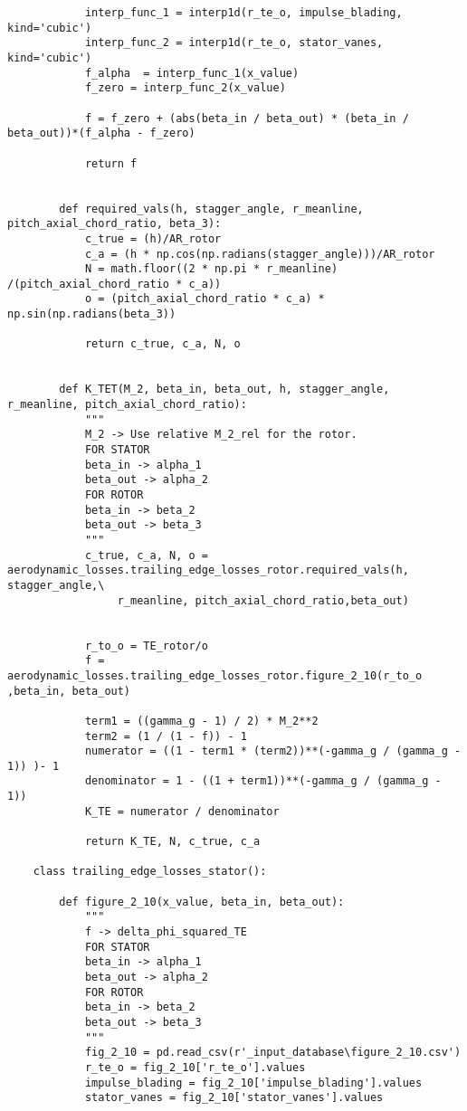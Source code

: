 \begin{verbatim}
            interp_func_1 = interp1d(r_te_o, impulse_blading, kind='cubic')
            interp_func_2 = interp1d(r_te_o, stator_vanes, kind='cubic')
            f_alpha  = interp_func_1(x_value)
            f_zero = interp_func_2(x_value)

            f = f_zero + (abs(beta_in / beta_out) * (beta_in / beta_out))*(f_alpha - f_zero)

            return f
        

        def required_vals(h, stagger_angle, r_meanline, pitch_axial_chord_ratio, beta_3):
            c_true = (h)/AR_rotor
            c_a = (h * np.cos(np.radians(stagger_angle)))/AR_rotor
            N = math.floor((2 * np.pi * r_meanline) /(pitch_axial_chord_ratio * c_a))
            o = (pitch_axial_chord_ratio * c_a) * np.sin(np.radians(beta_3))

            return c_true, c_a, N, o
            

        def K_TET(M_2, beta_in, beta_out, h, stagger_angle, r_meanline, pitch_axial_chord_ratio):
            """
            M_2 -> Use relative M_2_rel for the rotor.
            FOR STATOR
            beta_in -> alpha_1
            beta_out -> alpha_2
            FOR ROTOR
            beta_in -> beta_2
            beta_out -> beta_3
            """
            c_true, c_a, N, o = aerodynamic_losses.trailing_edge_losses_rotor.required_vals(h, stagger_angle,\
                 r_meanline, pitch_axial_chord_ratio,beta_out)


            r_to_o = TE_rotor/o
            f = aerodynamic_losses.trailing_edge_losses_rotor.figure_2_10(r_to_o ,beta_in, beta_out)
            
            term1 = ((gamma_g - 1) / 2) * M_2**2
            term2 = (1 / (1 - f)) - 1
            numerator = ((1 - term1 * (term2))**(-gamma_g / (gamma_g - 1)) )- 1
            denominator = 1 - ((1 + term1))**(-gamma_g / (gamma_g - 1))
            K_TE = numerator / denominator
            
            return K_TE, N, c_true, c_a
        
    class trailing_edge_losses_stator():

        def figure_2_10(x_value, beta_in, beta_out):
            """
            f -> delta_phi_squared_TE
            FOR STATOR
            beta_in -> alpha_1
            beta_out -> alpha_2
            FOR ROTOR
            beta_in -> beta_2
            beta_out -> beta_3
            """
            fig_2_10 = pd.read_csv(r'_input_database\figure_2_10.csv')
            r_te_o = fig_2_10['r_te_o'].values
            impulse_blading = fig_2_10['impulse_blading'].values
            stator_vanes = fig_2_10['stator_vanes'].values


\end{verbatim}
